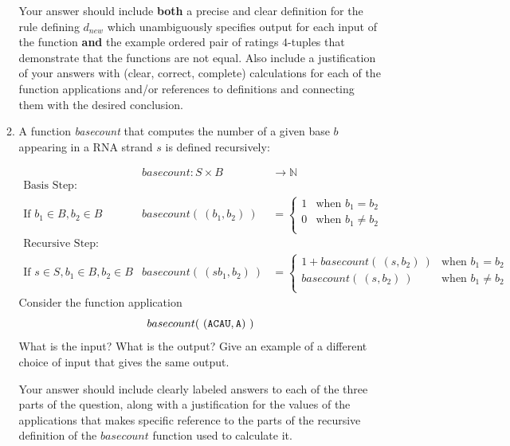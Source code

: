 \begin{enumerate}[labelindent=0pt, leftmargin=0pt]
\begin{enumerate}
    Your answer should include  {\bf both} a precise and clear definition for the rule defining
    $d_{new}$ which unambiguously specifies output for each input of the function {\bf and}
    the example ordered pair of ratings $4$-tuples that demonstrate that the functions are not equal.
    Also include a justification 
    of your answers with (clear, correct, complete) calculations for each of the function applications 
    and/or references to definitions and connecting them with
    the desired conclusion.

\item\gradeCorrect A function \textit{basecount} that computes the number of a given base 
$b$ appearing in a RNA strand $s$ is defined recursively:
    
\[
\begin{array}{llll}
& \textit{basecount} : S \times B & \to \mathbb{N} &\\
\textrm{Basis Step:} &  \\
\textrm{If } b_1 \in B, b_2 \in B & \textit{basecount}(~(b_1, b_2)~) & = 
        \begin{cases}
            1 & \textrm{when } b_1 = b_2 \\
            0 & \textrm{when } b_1 \neq b_2 \\
        \end{cases}& \\
\textrm{Recursive Step:} & \\
\textrm{If } s \in S, b_1 \in B, b_2 \in B &\textit{basecount}(~(s b_1, b_2)~) & =
        \begin{cases}
            1 + \textit{basecount}(~(s, b_2)~) & \textrm{when } b_1 = b_2 \\
            \textit{basecount}(~(s, b_2)~) & \textrm{when } b_1 \neq b_2 \\
        \end{cases} &
\end{array}
\]
Consider the function application 
\[
  basecount( ~(\texttt{A}\texttt{C}\texttt{A}\texttt{U}, \texttt{A})~)
\]
What is the input?  What is the output? Give an example of a different choice of input that 
gives the same output.

Your answer should include clearly labeled answers to each of the three parts of the question, 
along with a justification for the values of the applications that makes specific reference to 
the parts of the recursive definition of the $basecount$ function used to calculate it.
\end{enumerate}
\end{enumerate}
\newpage


